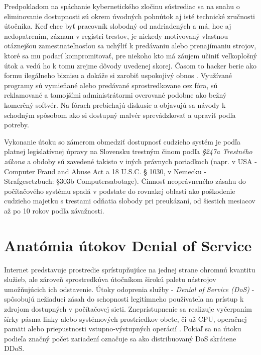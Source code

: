 \documentclass[12pt, a4paper]{article}
\begin{document}
Predpokladom na spáchanie kybernetického zločinu sústrediac sa na snahu o eliminovanie dostupnosti
sú okrem úvodných pohnútok aj isté technické zručnosti útočníka. Keď chce byť pracovník slobodný od 
nadriadených a má, hoc aj nedopatrením, záznam v registri trestov, je niekedy motivovaný vlastnou 
otáznejšou zamestnateľnosťou sa uchýliť k predávaniu alebo prenajímaniu strojov, ktoré sa mu podarí 
kompromitovať, pre niekoho kto má záujem učiniť veľkoplošný útok a vedú ho k tomu zrejme dôvody uvedenej 
skorej. Časom to hacker berie ako formu ilegálneho biznisu a dokáže si zarobiť uspokojivý obnos 
\cite{infiltrating-botnet}. Využívané programy sú vymieňané alebo predávané sprostredkovane cez fóra,
sú reklamované a tamojšími administrátormi overované podobne ako bežný komerčný softvér. Na fórach 
prebiehajú diskusie a objavujú sa návody k schodným spôsobom ako si dostupný malvér sprevádzkovať 
a upraviť podľa potreby.

Vykonanie útoku so zámerom obmedziť dostupnosť cudzieho systém je podľa platnej legislatívnej úpravy 
na Slovensku trestným činom podľa \emph{§247a Trestného zákona} a obdoby sú zavedené takisto v iných 
právnych poriadkoch (napr. v USA - Computer Fraud and Abuse Act a 18 U.S.C. § 1030, v Nemecku - 
Strafgesetzbuch: §303b  Computersabotage). Činnosť neoprávneného zásahu do počítačového systému spadá v 
podstate do rovnakej oblasti ako poškodenie cudzieho majetku s trestami odňatia slobody pri preukázaní, od 
šiestich mesiacov až po 10 rokov podľa závažnosti\cite{trestny-zakon}. 
\newpage
\section{Anatómia útokov Denial of Service}
Internet predstavuje prostredie sprístupňujúce na jednej strane ohromnú kvantitu služieb, ale zároveň 
sprostredkúva útočníkom širokú paletu nástrojov umožňujúcich ich odstavenie. Útoky odoprenia služby
- \emph{Denial of Service (DoS)} - spôsobujú nežiaduci zásah do schopnosti legitímneho 
používateľa na prístup k zdrojom dostupných v počítačovej sieti. Zneprístupnenie sa realizuje vyčerpaním šírky pásma linky alebo systémových prostriedkov obete, či už CPU, operačnej pamäti alebo priepustnosti 
vstupno-výstupných operácií \cite{ddos-attacks}. Pokiaľ sa na útoku podieľa značný počet zariadení označuje 
sa ako distribuovaný DoS skrátene DDoS. 
\end{document}
